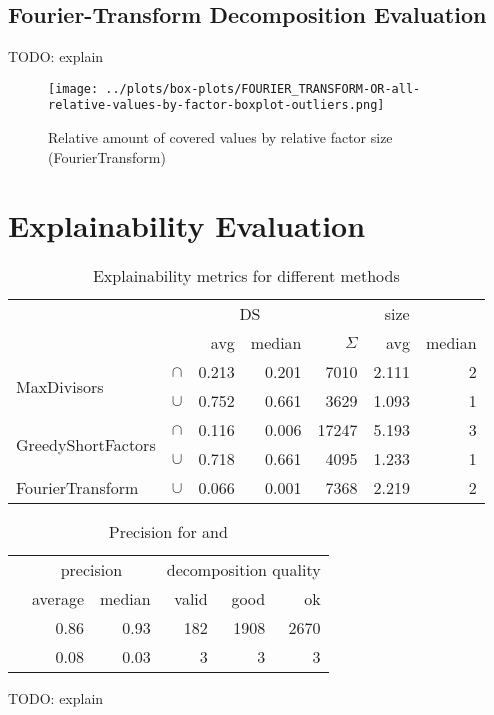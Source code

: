 \subsection{Fourier-Transform Decomposition Evaluation}
\label{ch:Evaluation:decomposition-quality:fourier}
TODO: explain
\begin{figure}[h]
	\texttt{[image: ../plots/box-plots/FOURIER\_TRANSFORM-OR-all-relative-values-by-factor-boxplot-outliers.png]}
	\caption{Relative amount of covered values by relative factor size (FourierTransform)}
	\label{fig:eval:fourier-all-factors-box-plot}
\end{figure}


\newpage
\section{Explainability Evaluation}
\label{ch:Evaluation:explainability}

\begin{table}[h]
	\centering
	\begin{tabular}{ll|rr|rrr}
		& &  \multicolumn{2}{c}{DS} & \multicolumn{3}{c}{size}  \\
		& & avg & median & $\Sigma$ & avg & median\\
		\hline
		\multirow{2}{*}{MaxDivisors} & $\cap$ & 0.213 & 0.201 & 7010 & 2.111 & 2 \\
		& $\cup$ & 0.752 & 0.661 & 3629 & 1.093 & 1 \\
		\hline
		\multirow{2}{*}{GreedyShortFactors} & $\cap$  & 0.116 & 0.006 & 17247 & 5.193 & 3 \\
		& $\cup$ & 0.718 & 0.661 & 4095 & 1.233 & 1 \\
		\hline
		FourierTransform & $\cup$ & 0.066 & 0.001 & 7368 & 2.219 & 2 \\
	\end{tabular}
	\caption{Explainability metrics for different methods}
	\label{tab:eval-metric}
\end{table}

\begin{table}[h]
	\centering
	\begin{tabular}{l|rr|rrr}
		 & \multicolumn{2}{c}{precision} & \multicolumn{3}{c}{decomposition quality} \\
		 & average & median & valid & good & ok \\
		 \hline
		 \andDecomp & 0.86 & 0.93 &  182 & 1908 & 2670\\
		 \orDecomp & 0.08 & 0.03 & 3 & 3 & 3 \\
	\end{tabular}
	\caption{Precision for \andDecomp and \orDecomp}
	\label{tab:eval-precision}
\end{table}

TODO: explain
